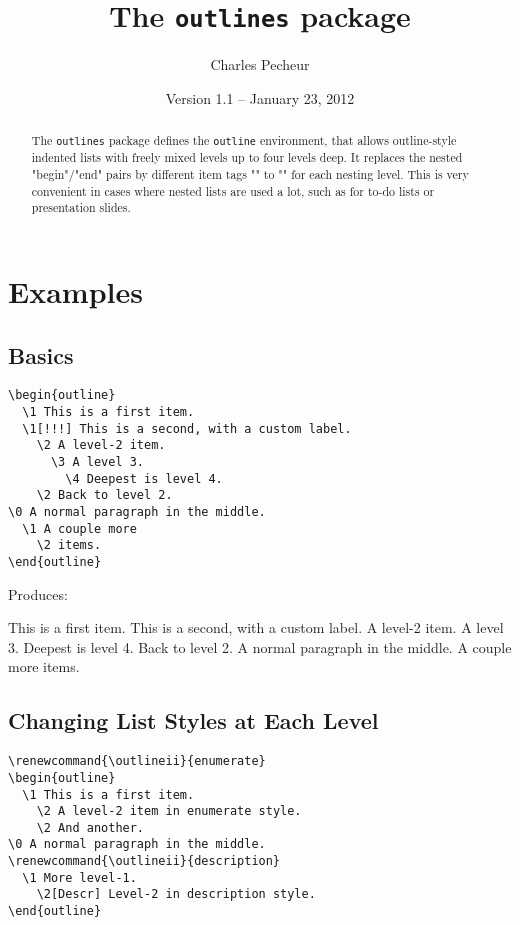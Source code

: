 \documentclass[11pt]{article}
\title{The \texttt{outlines} package}
\author{Charles Pecheur}
\date{Version 1.1 -- January 23, 2012}
\begin{document}
\maketitle

\begin{abstract}
The \texttt{outlines} package defines the \texttt{outline} environment,
that allows outline-style indented lists with freely mixed levels up
to four levels deep.  It replaces the nested "begin"/"end" pairs by
different item tags "\1" to "\4" for each nesting level.  This is very
convenient in cases where nested lists are used a lot, such as for to-do
lists or presentation slides.
\end{abstract}
	

\section{Examples}

\subsection{Basics}

{\small\begin{verbatim}
\begin{outline}
  \1 This is a first item.
  \1[!!!] This is a second, with a custom label.
    \2 A level-2 item.
      \3 A level 3.
        \4 Deepest is level 4.
    \2 Back to level 2.
\0 A normal paragraph in the middle.
  \1 A couple more  
    \2 items.
\end{outline}
\end{verbatim}}

\noindent Produces:

{\small
\begin{outline}
  \1 This is a first item.  
  \1[!!!] This is a second, with a custom label.
    \2 A level-2 item.
      \3 A level 3.
        \4 Deepest is level 4.
    \2 Back to level 2.
\0 A normal paragraph in the middle.
  \1 A couple more
    \2 items.
\end{outline}
}

\subsection{Changing List Styles at Each Level}

{\small\begin{verbatim}
\renewcommand{\outlineii}{enumerate}
\begin{outline}
  \1 This is a first item.  
    \2 A level-2 item in enumerate style.
    \2 And another.
\0 A normal paragraph in the middle.
\renewcommand{\outlineii}{description}
  \1 More level-1.
    \2[Descr] Level-2 in description style.
\end{outline}
\end{verbatim}}
\end{document}
